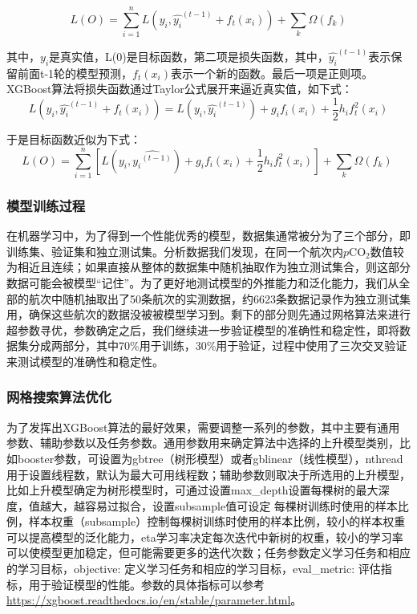 \begin{equation}
    \label{equ:xgb-3}
   L(O)=\sum_{i=1}^nL(y_i,\widehat{y_i}^{(t-1)}+f_t(x_i))+\sum_k \Omega(f_k)
\end{equation}

其中，$y_i$是真实值，L(0)是目标函数，第二项是损失函数，其中，$\widehat{y_i}^{(t-1)}$表示保留前面t-1轮的模型预测，$f_t(x_i)$表示一个新的函数。最后一项是正则项。XGBoost算法将损失函数通过Taylor公式展开来逼近真实值，如下式：
\begin{equation}
    \label{equ:xgb-4}
   L(y_i,\widehat{y_i}^{(t-1)} +f_t(x_i)) = L(y_i,\widehat{y_i}^{(t-1)})+g_if_i(x_i)+\frac{1}{2}h_if_t^2(x_i)
\end{equation}

于是目标函数近似为下式：
\begin{equation}
    \label{equ:xgb-5}
   L\left(O\right)=\sum_{i=1}^{n}\left[L\left(y_i,\widehat{{y_i}^{\left(t-1\right)}}\right)+g_if_i\left(x_i\right)+\frac{1}{2}h_if_t^2\left(x_i\right)\right]+\sum_{k}{\Omega\left(f_k\right)\ }
\end{equation}

\subsubsection{模型训练过程}
在机器学习中，为了得到一个性能优秀的模型，数据集通常被分为了三个部分，即训练集、验证集和独立测试集。分析数据我们发现，在同一个航次内$p\mathrm{CO_2}$数值较为相近且连续；如果直接从整体的数据集中随机抽取作为独立测试集合，则这部分数据可能会被模型“记住”。为了更好地测试模型的外推能力和泛化能力，我们从全部的航次中随机抽取出了50条航次的实测数据，约6623条数据记录作为独立测试集用，确保这些航次的数据没被被模型学习到。剩下的部分则先通过网格算法来进行超参数寻优，参数确定之后，我们继续进一步验证模型的准确性和稳定性，即将数据集分成两部分，其中70\%用于训练，30\%用于验证，过程中使用了三次交叉验证来测试模型的准确性和稳定性。

\subsubsection{网格搜索算法优化}
为了发挥出XGBoost算法的最好效果，需要调整一系列的参数，其中主要有通用参数、辅助参数以及任务参数。通用参数用来确定算法中选择的上升模型类别，比如booster参数，可设置为gbtree（树形模型）或者gblinear（线性模型），nthread用于设置线程数，默认为最大可用线程数；辅助参数则取决于所选用的上升模型，比如上升模型确定为树形模型时，可通过设置max\_depth设置每棵树的最大深度，值越大，越容易过拟合，设置subsample值可设定 每棵树训练时使用的样本比例，样本权重（subsample）控制每棵树训练时使用的样本比例，较小的样本权重可以提高模型的泛化能力，eta学习率决定每次迭代中新树的权重，较小的学习率可以使模型更加稳定，但可能需要更多的迭代次数；任务参数定义学习任务和相应的学习目标，objective: 定义学习任务和相应的学习目标，eval\_metric: 评估指标，用于验证模型的性能。参数的具体指标可以参考\url{https://xgboost.readthedocs.io/en/stable/parameter.html}。

